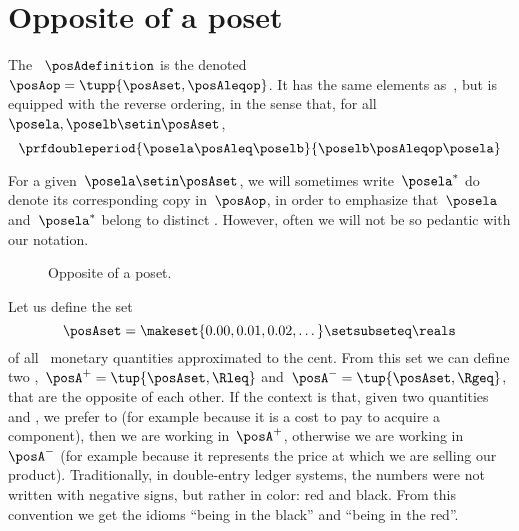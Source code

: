 
\section{Opposite of a poset}\label{sec:opposite-of-a-poset}

\begin{ctdefinition}
    \label{def:poset-opposite}
    The ~$\posAdefinition$ is the  denoted~$\posAop=\tupp{\posAset, \posAleqop}$.
    It has the same elements as~\posA, but is equipped with the reverse ordering, in the sense that, for all~$\posela,\poselb \setin \posAset$,
    \begin{equation}\label{eq:poset-opposite}
        \prfdoubleperiod{
            \posela \posAleq \poselb
        }{
            \poselb \posAleqop \posela
        }
    \end{equation}
\end{ctdefinition}
For a given~$\posela \setin \posAset$, we will sometimes write~$\posela^*$ do denote its corresponding copy in~$\posAop$, in order to emphasize that~$\posela$ and~$\posela^*$ belong to distinct .
However, often we will not be so pedantic with our notation.

\begin{figure}[tbh]
    \centering
    \caption{
        Opposite of a poset.
    }
    \label{fig:poset-opposite}
\end{figure}

\begin{example}
    Let us define the set
    \begin{equation}\label{eq:credit-debit}
        \posAset=\makeset{0.00,0.01,0.02,\dots}\setsubseteq\reals
    \end{equation}
    of all \CHFneutral \ monetary quantities approximated to the cent.
    From this set we can define two ,~$\posA^{+} = \tup{\posAset, {{\Rleq}}}$ and~$\posA^{-} = \tup{\posAset,{{ \Rgeq}}}$, that are the opposite of each other.
    If the context is that, given two quantities \unit[1]{\CHFneutral} and \unit[2]{\CHFneutral}, we prefer \unit[1]{\CHFneutral} to \unit[2]{\CHFneutral} (for example because it is a cost to pay to acquire a component), then we are working in~$\posA^{+}$, otherwise we are working in~$\posA^{-}$ (for example because it represents the price at which we are selling our product).
    Traditionally, in double-entry ledger systems, the numbers were not written with negative signs, but rather in color: red and black.
    From this convention we get the idioms ``being in the black'' and ``being in the red''.
\end{example}
